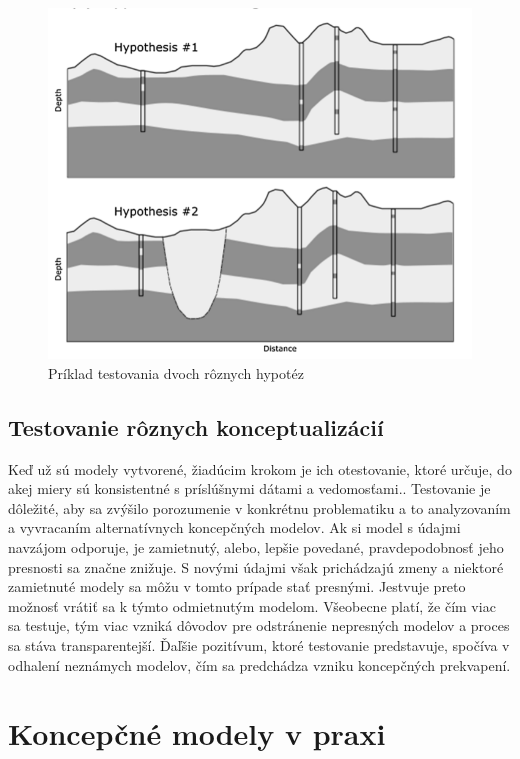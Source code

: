 \documentclass[10pt,twoside,slovak, a4paper]{article}
\begin{document}
{\begin{figure}[tbh]
\centering
	\includegraphics[width=\linewidth]{fig2.png}
	\caption{Príklad testovania dvoch rôznych hypotéz\cite{Enemark:HCMBaT}}
	\label{Obr:2}
\end{figure}
 
\subsection{Testovanie rôznych konceptualizácií} \label{neistota:testovanie}

Keď už sú modely vytvorené, žiadúcim krokom je ich otestovanie, ktoré určuje, do akej miery sú konsistentné s príslúšnymi dátami a vedomosťami.\cite{Enemark:HCMBaT}. Testovanie je dôležité, aby sa zvýšilo porozumenie v konkrétnu problematiku a to analyzovaním a vyvracaním alternatívnych koncepčných modelov.\cite{HC-Model}  Ak si model s údajmi navzájom odporuje, je zamietnutý, alebo, lepšie povedané, pravdepodobnosť jeho presnosti sa značne znižuje. S novými údajmi však prichádzajú zmeny a niektoré zamietnuté modely sa môžu v tomto prípade stať presnými. Jestvuje preto možnosť vrátiť sa k týmto odmietnutým modelom. Všeobecne platí, že čím viac sa testuje, tým viac vzniká dôvodov pre odstránenie nepresných modelov a proces sa stáva transparentejší. Ďaľšie pozitívum, ktoré testovanie predstavuje, spočíva v odhalení neznámych modelov, čím sa predchádza vzniku koncepčných prekvapení. \cite{Enemark:HCMBaT}

\section{Koncepčné modely v praxi} \label{koncepcne modely}

}
\end{document}
